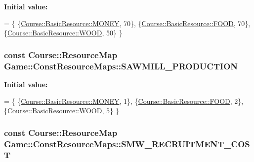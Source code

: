 {\bfseries Initial value\-:}
\begin{DoxyCode}
= \{
    \{\hyperlink{namespaceCourse_a02d49c04029594d4adba79b84bb85f65aff016add6bbbdbb44abf1d2d7f215ec0}{Course::BasicResource::MONEY}, 70\},
    \{\hyperlink{namespaceCourse_a02d49c04029594d4adba79b84bb85f65a7018c47af38bfc1390a89e70b4cf4760}{Course::BasicResource::FOOD}, 70\},
    \{\hyperlink{namespaceCourse_a02d49c04029594d4adba79b84bb85f65a87287be3009253b983ffb2e9f91eef22}{Course::BasicResource::WOOD}, 50\}
\}
\end{DoxyCode}
\hypertarget{namespaceGame_1_1ConstResourceMaps_a1302532b63eb3d623779fb539dd767e8}{
\subsubsection[{S\-A\-W\-M\-I\-L\-L\-\_\-\-P\-R\-O\-D\-U\-C\-T\-I\-O\-N}]{\setlength{\rightskip}{0pt plus 5cm}const {\bf Course\-::\-Resource\-Map} Game\-::\-Const\-Resource\-Maps\-::\-S\-A\-W\-M\-I\-L\-L\-\_\-\-P\-R\-O\-D\-U\-C\-T\-I\-O\-N}}\label{namespaceGame_1_1ConstResourceMaps_a1302532b63eb3d623779fb539dd767e8}
{\bfseries Initial value\-:}
\begin{DoxyCode}
= \{
    \{\hyperlink{namespaceCourse_a02d49c04029594d4adba79b84bb85f65aff016add6bbbdbb44abf1d2d7f215ec0}{Course::BasicResource::MONEY}, 1\},
    \{\hyperlink{namespaceCourse_a02d49c04029594d4adba79b84bb85f65a7018c47af38bfc1390a89e70b4cf4760}{Course::BasicResource::FOOD}, 2\},
    \{\hyperlink{namespaceCourse_a02d49c04029594d4adba79b84bb85f65a87287be3009253b983ffb2e9f91eef22}{Course::BasicResource::WOOD}, 5\}
\}
\end{DoxyCode}
\hypertarget{namespaceGame_1_1ConstResourceMaps_aece4521104576e9af5ab8635b786c840}{
\subsubsection[{S\-M\-W\-\_\-\-R\-E\-C\-R\-U\-I\-T\-M\-E\-N\-T\-\_\-\-C\-O\-S\-T}]{\setlength{\rightskip}{0pt plus 5cm}const {\bf Course\-::\-Resource\-Map} Game\-::\-Const\-Resource\-Maps\-::\-S\-M\-W\-\_\-\-R\-E\-C\-R\-U\-I\-T\-M\-E\-N\-T\-\_\-\-C\-O\-S\-T}}\label{namespaceGame_1_1ConstResourceMaps_aece4521104576e9af5ab8635b786c840}
